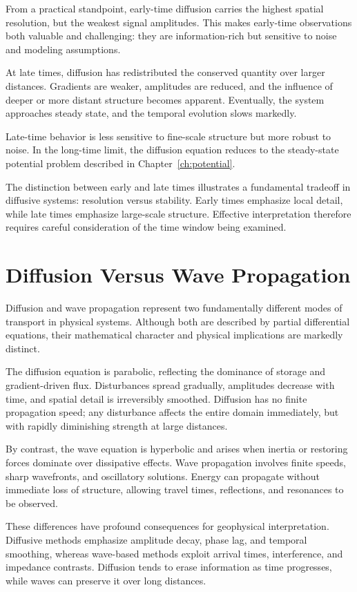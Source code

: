 From a practical standpoint, early-time diffusion carries the highest spatial resolution, but the weakest signal amplitudes. This makes early-time observations both valuable and challenging: they are information-rich but sensitive to noise and modeling assumptions.

At late times, diffusion has redistributed the conserved quantity over larger distances. Gradients are weaker, amplitudes are reduced, and the influence of deeper or more distant structure becomes apparent. Eventually, the system approaches steady state, and the temporal evolution slows markedly.

Late-time behavior is less sensitive to fine-scale structure but more robust to noise. In the long-time limit, the diffusion equation reduces to the steady-state potential problem described in Chapter~\ref{ch:potential}.

The distinction between early and late times illustrates a fundamental tradeoff in diffusive systems: resolution versus stability. Early times emphasize local detail, while late times emphasize large-scale structure. Effective interpretation therefore requires careful consideration of the time window being examined.

\section{Diffusion Versus Wave Propagation}

Diffusion and wave propagation represent two fundamentally different modes of transport in physical systems. Although both are described by partial differential equations, their mathematical character and physical implications are markedly distinct.

The diffusion equation is parabolic, reflecting the dominance of storage and gradient-driven flux. Disturbances spread gradually, amplitudes decrease with time, and spatial detail is irreversibly smoothed. Diffusion has no finite propagation speed; any disturbance affects the entire domain immediately, but with rapidly diminishing strength at large distances.

By contrast, the wave equation is hyperbolic and arises when inertia or restoring forces dominate over dissipative effects. Wave propagation involves finite speeds, sharp wavefronts, and oscillatory solutions. Energy can propagate without immediate loss of structure, allowing travel times, reflections, and resonances to be observed.

These differences have profound consequences for geophysical interpretation.  Diffusive methods emphasize amplitude decay, phase lag, and temporal smoothing, whereas wave-based methods exploit arrival times, interference, and impedance contrasts. Diffusion tends to erase information as time progresses, while waves can preserve it over long distances.

